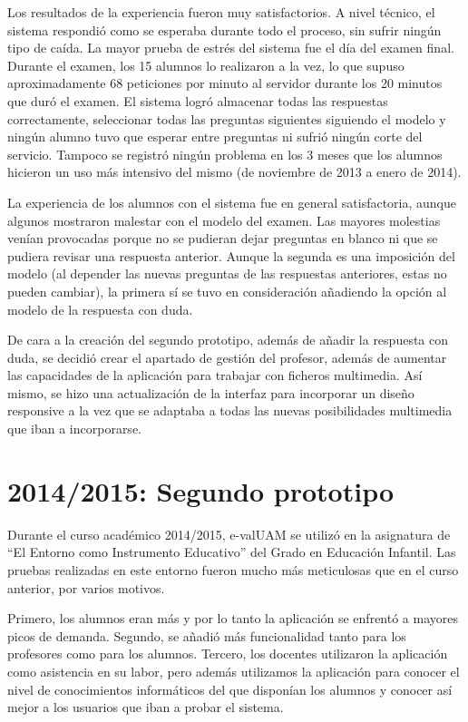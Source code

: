 Los resultados de la experiencia fueron muy satisfactorios. A nivel técnico, el sistema respondió como se esperaba durante todo el proceso, sin sufrir ningún tipo de caída. La mayor prueba de estrés del sistema fue el día del examen final. Durante el examen, los 15 alumnos lo realizaron a la vez, lo que supuso aproximadamente 68 peticiones por minuto al servidor durante los 20 minutos que duró el examen. El sistema logró almacenar todas las respuestas correctamente, seleccionar todas las preguntas siguientes siguiendo el modelo y ningún alumno tuvo que esperar entre preguntas ni sufrió ningún corte del servicio. Tampoco se registró ningún problema en los 3 meses que los alumnos hicieron un uso más intensivo del mismo (de noviembre de 2013 a enero de 2014).

La experiencia de los alumnos con el sistema fue en general satisfactoria, aunque algunos mostraron malestar con el modelo del examen. Las mayores molestias venían provocadas porque no se pudieran dejar preguntas en blanco ni que se pudiera revisar una respuesta anterior. Aunque la segunda es una imposición del modelo (al depender las nuevas preguntas de las respuestas anteriores, estas no pueden cambiar), la primera sí se tuvo en consideración añadiendo la opción al modelo de la respuesta con duda.

De cara a la creación del segundo prototipo, además de añadir la respuesta con duda, se decidió crear el apartado de gestión del profesor, además de aumentar las capacidades de la aplicación para trabajar con ficheros multimedia. Así mismo, se hizo una actualización de la interfaz para incorporar un diseño responsive a la vez que se adaptaba a todas las nuevas posibilidades multimedia que iban a incorporarse.

\section{2014/2015: Segundo prototipo}

Durante el curso académico 2014/2015, e-valUAM se utilizó en la asignatura de ``El Entorno como Instrumento Educativo'' del Grado en Educación Infantil. Las pruebas realizadas en este entorno fueron mucho más meticulosas que en el curso anterior, por varios motivos. 

Primero, los alumnos eran más y por lo tanto la aplicación se enfrentó a mayores picos de demanda. Segundo, se añadió más funcionalidad tanto para los profesores como para los alumnos. Tercero, los docentes utilizaron la aplicación como asistencia en su labor, pero además utilizamos la aplicación para conocer el nivel de conocimientos informáticos del que disponían los alumnos y conocer así mejor a los usuarios que iban a probar el sistema.

